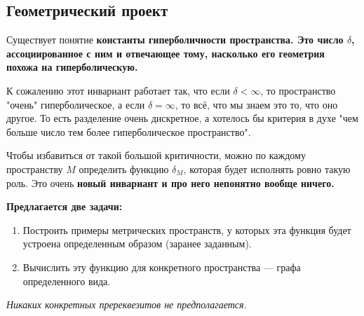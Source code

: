 \documentclass[12pt, oneside, dvipsnames]{extarticle}
\begin{document}
	\begin{center}
		\subsection*{Геометрический проект}
	\end{center}

	Существует понятие \bf{константы гиперболичности пространства}. Это число $\delta$, ассоциированное с ним и отвечающее тому, насколько его геометрия похожа на гиперболическую. 

	К сожалению этот инвариант работает так, что если $\delta < \infty$, то пространство "очень" гиперболическое, а если $\delta = \infty$, то всё, что мы знаем это то, что оно другое. То есть разделение очень дискретное, а хотелось бы критерия в духе "чем больше число тем более гиперболическое пространство".

	Чтобы избавиться от такой большой критичности, можно по каждому пространству $M$ определить функцию $\delta_M$, которая будет исполнять ровно такую роль. Это очень \bf{новый} инвариант и про него непонятно вообще ничего. 

	\noindent\bf{Предлагается две задачи:}
	\begin{enumerate}
		\item Построить примеры метрических пространств, у которых эта функция будет устроена определенным образом (заранее заданным).
		\item Вычислить эту функцию для конкретного пространства --- графа определенного вида. 
	\end{enumerate}

	\emph{Никаких конкретных пререквезитов не предполагается.}

	\printbibliography
\end{document}
